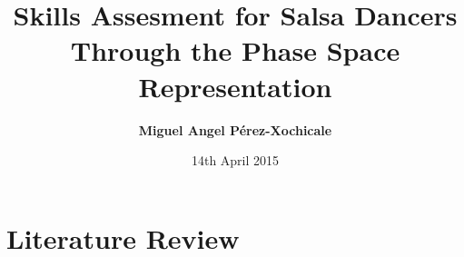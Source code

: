 \documentclass{beamer}
\title[Skills Assesment of Human Motion Through the Phase Space Representation]
{Skills Assesment for Salsa Dancers Through the Phase Space Representation}
\author[Miguel Angel P\'erez-Xochicale]
{   %
    \textbf{Miguel Angel P\'erez-Xochicale}
}
\institute[CVC-IIIA]
{   %

      \vspace{5mm}
    \begin{tabular}{c}
    Research Awarness Day \\
    EECE School
    \end{tabular}
}
\date[DEMO-2013]
{   %
     14th April 2015
}
\begin{document}
\frame{\titlepage}





\section{Literature Review}



% 
% 
% 
% 
\end{document}
